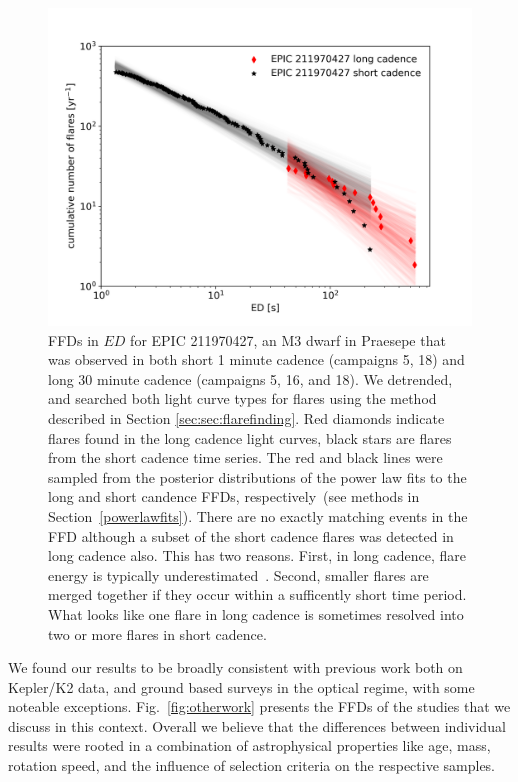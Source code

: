 \documentclass{aa}
\begin{document}
\begin{figure}[ht!]
    \centering
    \includegraphics[width=\hsize]{pics/FFDs/EPIC211970427_long_vs_short_cadence_ffd.png}
    \caption{FFDs in $ED$ for EPIC 211970427, an M3 dwarf in Praesepe that was observed in both short 1 minute cadence (campaigns 5, 18) and long 30 minute cadence (campaigns 5, 16, and 18). We detrended, and searched both light curve types for flares using the method described in Section \ref{sec:sec:flarefinding}. Red diamonds indicate flares found in the long cadence light curves, black stars are flares from the short cadence time series. The red and black lines were sampled from the posterior distributions of the power law fits to the long and short candence FFDs, respectively~(see methods in Section~\ref{powerlawfits}). There are no exactly matching events in the FFD although a subset of the short cadence flares was detected in long cadence also. This has two reasons. First, in long cadence, flare energy is typically underestimated~\citep{yang_flaresampling_2018}. Second, smaller flares are merged together if they occur within a sufficently short time period. What looks like one flare in long cadence is sometimes resolved into two or more flares in short cadence.}          
    \label{fig:shortlong}
\end{figure}
We found our results to be broadly consistent with previous work both on Kepler/K2 data, and ground based surveys in the optical regime, with some noteable exceptions. Fig.~\ref{fig:otherwork} presents the FFDs of the studies that we discuss in this context. Overall we believe that the differences between individual results were rooted in a combination of astrophysical properties like age, mass, rotation speed, and the influence of selection criteria on the respective samples. 
\end{document}
